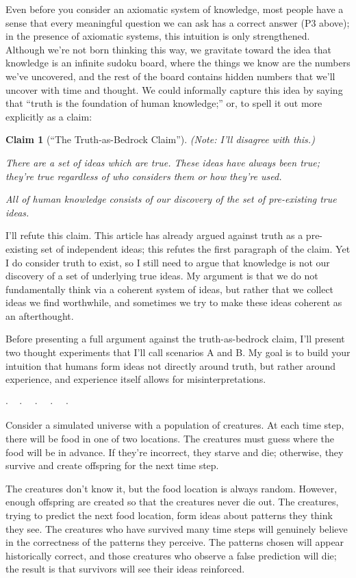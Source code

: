 \documentclass[11pt, oneside]{article}
\newtheorem*{claim}{Claim}
\theoremstyle{argtstyle}
\newcommand{\dotq}{\cdot\quad}
\newcommand{\scenebreak}{
    \medskip\centerline{$\dotq\dotq\dotq\dotq\cdot$}\medskip
}
\begin{document}
Even before you consider an axiomatic system of knowledge, most people have a
sense that every meaningful question we can ask has a correct answer (P3
above); in the presence of axiomatic systems, this intuition is only
strengthened.
Although we're not born thinking this way,
we gravitate toward
the idea that knowledge is an infinite sudoku board, where
the things we know are the numbers we've uncovered, and the rest of the board
contains hidden numbers that we'll uncover with time and thought.
We could informally capture this idea by saying that ``truth is the foundation
of
human knowledge;'' or, to spell it out more explicitly as a claim:
\begin{claim}[``The Truth-as-Bedrock Claim'']
    {\normalfont (Note: I'll disagree with this.)}
    
    There are a set of ideas which are true.
    These ideas have always been true; they're true
    regardless of who considers them or how they're used.

    All of human knowledge consists of our discovery
    of the set of pre-existing true ideas.
\end{claim}

I'll refute this claim.
This article has already argued against truth
as a pre-existing set of independent ideas; this refutes the first paragraph of
the claim.
Yet I do consider truth to exist, so I still need to argue that knowledge is not
our discovery of a set of underlying true ideas.
My argument is that we
do not fundamentally
think via a coherent system of ideas, but rather that we collect ideas we
find worthwhile, and sometimes we try to make these ideas coherent as an
afterthought.

Before presenting a full argument against the truth-as-bedrock claim,
I'll present two
thought experiments that I'll call scenarios A and B.
My goal is to build your intuition that humans form ideas not directly around
truth, but rather around experience, and experience itself allows for
misinterpretations.

\scenebreak

\noindent [{\bf Scenario A.}]\quad
        Consider a simulated universe with a
        population of creatures. At each time step, there will be food in
        one of two locations.
        The creatures must guess where the food will
        be in advance. If they're incorrect, they starve and die; otherwise,
        they survive and create offspring for the next time step.

        The creatures don't know it, but the food location is always random.
        However, enough offspring are created so that the creatures never
        die out. The creatures, trying to predict the next food location,
        form ideas about patterns they think they see.
        The creatures who have survived
        many time steps will genuinely
        believe in the correctness of the patterns they perceive.
        The patterns chosen will appear historically correct, and those
        creatures who observe a false prediction will die; the result is that
        survivors will see their ideas reinforced.
\end{document}
